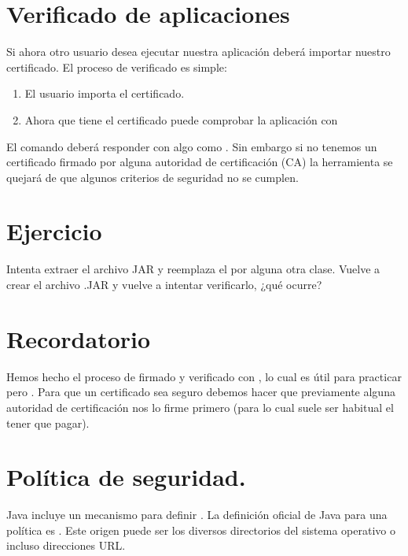 \documentclass[letterpaper,10pt,spanish]{sphinxmanual}
\begin{document}
\section{Verificado de aplicaciones}
\label{\detokenize{textos/tema5:verificado-de-aplicaciones}}
Si ahora otro usuario desea ejecutar nuestra aplicación deberá importar nuestro certificado. El proceso de verificado es simple:
\begin{enumerate}
\def\theenumi{\arabic{enumi}}
\def\labelenumi{\theenumi .}
\makeatletter\def\p@enumii{\p@enumi \theenumi .}\makeatother
\item {} 
El usuario importa el certificado.

\item {} 
Ahora que tiene el certificado puede comprobar la aplicación con 

\end{enumerate}

El comando deberá responder con algo como . Sin embargo si no tenemos un certificado firmado por alguna autoridad de certificación (CA) la herramienta se quejará de que algunos criterios de seguridad no se cumplen.


\section{Ejercicio}
\label{\detokenize{textos/tema5:ejercicio}}
Intenta extraer el archivo JAR y reemplaza el  por alguna otra clase. Vuelve a crear el archivo .JAR y vuelve a intentar verificarlo, ¿qué ocurre?


\section{Recordatorio}
\label{\detokenize{textos/tema5:recordatorio}}
Hemos hecho el proceso de firmado y verificado con , lo cual es útil para practicar pero . Para que un certificado sea seguro debemos hacer que previamente alguna autoridad de certificación nos lo firme primero (para lo cual suele ser habitual el tener que pagar).


\section{Política de seguridad.}
\label{\detokenize{textos/tema5:politica-de-seguridad}}
Java incluye un mecanismo para definir . La definición oficial de Java para una política es . Este origen puede ser los diversos directorios del sistema operativo o incluso direcciones URL.
\end{document}
